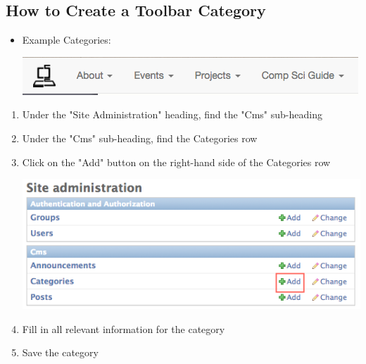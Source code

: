 \documentclass{article}
\begin{document}
\subsection*{How to Create a Toolbar Category}
\begin{itemize}
	\item Example Categories: 
	
	\includegraphics[scale=0.45]{Categories-picture1.png}
	
\end{itemize}
\begin{enumerate}
	\item Under the "Site Administration" heading, find the "Cms" sub-heading
	\item Under the "Cms" sub-heading, find the Categories row
	\item Click on the "Add" button on the right-hand side of the Categories row
	
	\includegraphics[scale=0.45]{Categories-picture2.png}
	
	\item Fill in all relevant information for the category
	\item Save the category
	
\end{enumerate}
\end{document}
